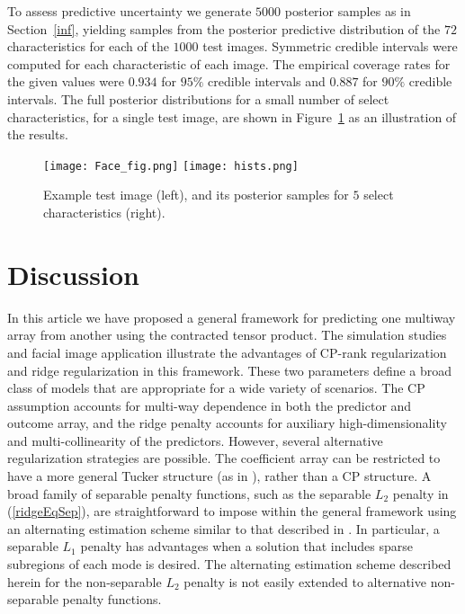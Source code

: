 \documentclass[12pt]{article}
\begin{document}
To assess predictive uncertainty we generate $5000$ posterior samples as in Section~\ref{inf}, yielding samples from the posterior predictive distribution of the $72$ characteristics for each of the $1000$ test images.  Symmetric credible intervals were computed for each characteristic of each image. The empirical coverage rates for the given values were $0.934$ for $95\%$ credible intervals and $0.887$ for $90\%$ credible intervals.  The full posterior distributions for a small number of select characteristics, for a single test image, are shown in Figure~\ref{fig:postHists} as an illustration of the results.           

\begin{figure}[!h]
\centering
\texttt{[image: Face\_fig.png]}
\texttt{[image: hists.png]}
\caption{\label{fig:postHists} Example test image (left), and its posterior samples for $5$ select characteristics (right).}
\end{figure}


\section{Discussion}
\label{discussion}

In this article we have proposed a general framework for predicting one multiway array from another using the contracted tensor product.  The simulation studies and facial image application illustrate the advantages of CP-rank regularization and ridge regularization in this framework.  These two parameters define a broad class of models that are appropriate for a wide variety of scenarios. The CP assumption accounts for multi-way dependence in both the predictor and outcome array, and the ridge penalty accounts for auxiliary high-dimensionality and multi-collinearity of the predictors.    However, several alternative regularization strategies are possible.  The coefficient array can be restricted to have a more general Tucker structure (as in \citet{li2013}), rather than a CP structure. A broad family of separable penalty functions, such as the separable $L_2$ penalty in (\ref{ridgeEqSep}), are straightforward to impose within the general framework using an alternating estimation scheme similar to that described in \citet{zhou2013tensor}.  In particular, a separable $L_1$ penalty has advantages when a solution that includes sparse subregions of each mode is desired. The alternating estimation scheme described herein for the non-separable $L_2$ penalty is not easily extended to alternative non-separable penalty functions.    
\end{document}

